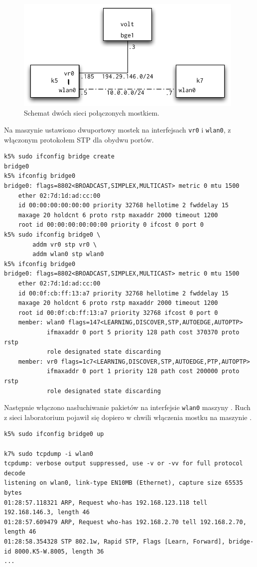 \begin{figure}[h!]
  \centering
  \includegraphics[width=11cm]{figury/mostek/schemat-po-konfiguracji.pdf}
  \caption{Schemat dwóch sieci połączonych mostkiem.}
  \label{fig:mostek:schemat_po_konfiguracji}
\end{figure}

Na maszynie \kp{} ustawiono dwuportowy mostek na interfejsach \texttt{vr0} i
\texttt{wlan0}, z włączonym protokołem STP dla obydwu portów.

\begin{lstlisting}
k5% sudo ifconfig bridge create
bridge0
k5% ifconfig bridge0
bridge0: flags=8802<BROADCAST,SIMPLEX,MULTICAST> metric 0 mtu 1500
    ether 02:7d:1d:ad:cc:00
    id 00:00:00:00:00:00 priority 32768 hellotime 2 fwddelay 15
    maxage 20 holdcnt 6 proto rstp maxaddr 2000 timeout 1200
    root id 00:00:00:00:00:00 priority 0 ifcost 0 port 0
k5% sudo ifconfig bridge0 \
        addm vr0 stp vr0 \
        addm wlan0 stp wlan0
k5% ifconfig bridge0
bridge0: flags=8802<BROADCAST,SIMPLEX,MULTICAST> metric 0 mtu 1500
    ether 02:7d:1d:ad:cc:00
    id 00:0f:cb:ff:13:a7 priority 32768 hellotime 2 fwddelay 15
    maxage 20 holdcnt 6 proto rstp maxaddr 2000 timeout 1200
    root id 00:0f:cb:ff:13:a7 priority 32768 ifcost 0 port 0
    member: wlan0 flags=147<LEARNING,DISCOVER,STP,AUTOEDGE,AUTOPTP>
            ifmaxaddr 0 port 5 priority 128 path cost 370370 proto rstp
            role designated state discarding
    member: vr0 flags=1c7<LEARNING,DISCOVER,STP,AUTOEDGE,PTP,AUTOPTP>
            ifmaxaddr 0 port 1 priority 128 path cost 200000 proto rstp
            role designated state discarding
\end{lstlisting}

Następnie włączono nasłuchiwanie pakietów na interfejsie \texttt{wlan0} maszyny
\ks{}. Ruch z sieci laboratorium pojawił się dopiero w chwili włączenia mostku
na maszynie \kp.

\begin{lstlisting}
k5% sudo ifconfig bridge0 up

k7% sudo tcpdump -i wlan0
tcpdump: verbose output suppressed, use -v or -vv for full protocol decode
listening on wlan0, link-type EN10MB (Ethernet), capture size 65535 bytes
01:28:57.118321 ARP, Request who-has 192.168.123.118 tell 192.168.146.3, length 46
01:28:57.609479 ARP, Request who-has 192.168.2.70 tell 192.168.2.70, length 46
01:28:58.354328 STP 802.1w, Rapid STP, Flags [Learn, Forward], bridge-id 8000.K5-W.8005, length 36
...
\end{lstlisting}

